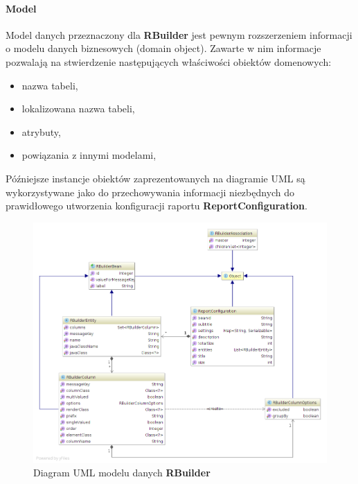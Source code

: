 			\paragraph{Model}
			Model danych przeznaczony dla \textbf{RBuilder} jest pewnym rozszerzeniem informacji o 
			modelu danych biznesowych (domain object). Zawarte w nim informacje pozwalają na stwierdzenie następujących
			właściwości obiektów domenowych:
			\begin{itemize}
				\item nazwa tabeli,
				\item lokalizowana nazwa tabeli,
				\item atrybuty,
				\item powiązania z innymi modelami,
			\end{itemize}
			
			Późniejsze instancje obiektów zaprezentowanych na diagramie UML są wykorzystywane jako do przechowywania
			informacji niezbędnych do prawidłowego utworzenia konfiguracji raportu \textbf{ReportConfiguration}.
			
			\begin{figure}[H]
				\centering
				\includegraphics[width=1.0\textwidth]{images/rbuilder_dataModel}
				\caption[Diagram UML modelu danych \textbf{RBuilder}]{
					Diagram UML modelu danych \textbf{RBuilder}
				}
				\label{app:rbuilder_data_Model}
			\end{figure}	
			
